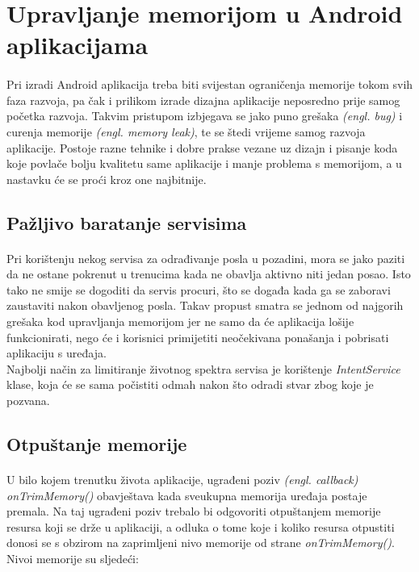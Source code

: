 \documentclass[times, utf8, zavrsni]{fer}
\begin{document}
\section{Upravljanje memorijom u Android aplikacijama}
\paragraph{}
Pri izradi Android aplikacija treba biti svijestan ograničenja memorije tokom svih faza razvoja, pa čak i prilikom izrade dizajna aplikacije neposredno prije samog početka razvoja. Takvim pristupom izbjegava se jako puno grešaka \textit{(engl. bug)} i curenja memorije \textit{(engl. memory leak)}, te se štedi vrijeme samog razvoja aplikacije. Postoje razne tehnike i dobre prakse vezane uz dizajn i pisanje koda koje povlače bolju kvalitetu same aplikacije i manje problema s memorijom, a u nastavku će se proći kroz one najbitnije.

\subsection{Pažljivo baratanje servisima}
\paragraph{}
Pri korištenju nekog servisa za odrađivanje posla u pozadini, mora se jako paziti da  ne ostane pokrenut u trenucima kada ne obavlja aktivno niti jedan posao. Isto tako ne smije se dogoditi da servis procuri, što se događa kada ga se zaboravi zaustaviti nakon obavljenog posla. Takav propust smatra se jednom od najgorih grešaka kod upravljanja memorijom jer ne samo da će aplikacija lošije funkcionirati, nego će i korisnici primijetiti neočekivana ponašanja i pobrisati aplikaciju s uređaja.\\

Najbolji način za limitiranje životnog spektra servisa je korištenje \textit{IntentService} klase, koja će se sama počistiti odmah nakon što odradi stvar zbog koje je pozvana.

\subsection{Otpuštanje memorije}
\paragraph{}
U bilo kojem trenutku života aplikacije, ugrađeni poziv \textit{(engl. callback)} \textit{onTrimMemory()} obavještava kada sveukupna memorija uređaja postaje premala. Na taj ugrađeni poziv trebalo bi odgovoriti otpuštanjem memorije resursa koji se drže u aplikaciji, a odluka o tome koje i koliko resursa otpustiti donosi se s obzirom na zaprimljeni nivo memorije od strane \textit{onTrimMemory()}. Nivoi memorije su sljedeći:
\end{document}
